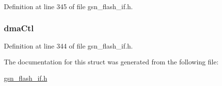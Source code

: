 Definition at line 345 of file gsn\_\-flash\_\-if.h.

\hypertarget{a00078_a11aeead5cc672407bce9c0447137dccf}{
\subsubsection[{dmaCtl}]{ {\bf dmaCtl}}}
\label{a00078_a11aeead5cc672407bce9c0447137dccf}


Definition at line 344 of file gsn\_\-flash\_\-if.h.



The documentation for this struct was generated from the following file:\begin{DoxyCompactItemize}
\item 
\hyperlink{a00501}{gsn\_\-flash\_\-if.h}\end{DoxyCompactItemize}
